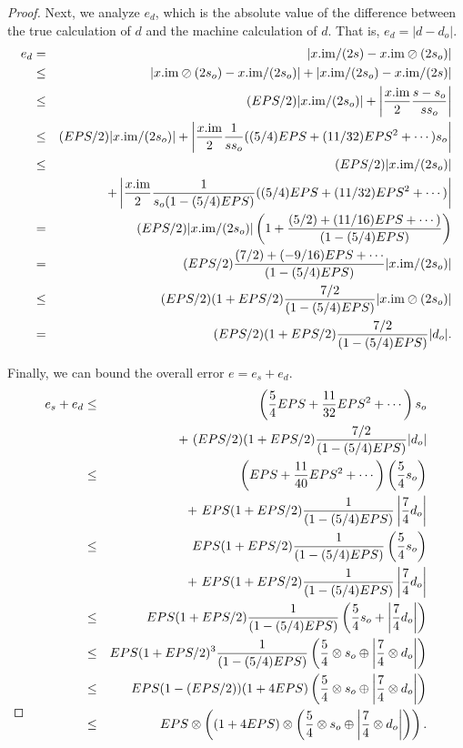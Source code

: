 \begin{proof}{}
Next, we analyze $e_d$, which is the absolute value of the difference between the true calculation of $d$ and the machine calculation of $d$.  That is, $e_d = |d - d_o|.$
\begin{eqnarray*}
e_d &=& |x.\mathrm {im}/(2s) - x.\mathrm {im} \oslash (2 s_o)|\\
&\le& |x.\mathrm {im} \oslash (2 s_o) - x.\mathrm {im} / (2 s_o)| + 
|x.\mathrm {im}/(2s_o) - x.\mathrm {im}/(2s) |\\
&\le& (EPS/2) |x.\mathrm {im} / (2 s_o)| + \left|{x.\mathrm {im} \over 2} {s - s_o \over s s_o} \right|\\
&\le& (EPS/2) |x .\mathrm {im}/ (2
s_o)| +\left|{x.\mathrm {im} \over 2} {1 \over s s_o} ((5/4)EPS + (11/32)EPS^2+\cdots) s_o\right|\\
&\le& (EPS/2) |x.\mathrm {im} / (2
s_o)| \\
&&+ \left|{x.\mathrm {im} \over 2} {1 \over s_o (1 - (5/4)EPS)}((5/4)EPS + (11/32)EPS^2+\cdots)\right|\\
&= &(EPS/2) |x .\mathrm {im}/ (2 s_o)| \left(1 + {(5/2) + (11/16)EPS+\cdots) \over (1 - (5/4)EPS)}\right)\\
&= &(EPS/2) {(7/2) + (-9/16) EPS +\cdots\over
(1 - (5/4)EPS)} |x .\mathrm {im}/ (2 s_o)|\\
&\le& (EPS/2) (1+EPS/2)
 {7/2 \over (1 - (5/4)EPS)}
|x .\mathrm {im} \oslash (2 s_o)|\\
&= &(EPS/2) (1+EPS/2)
 {7/2 \over (1 - (5/4)EPS)}
|d_o|.
\end{eqnarray*}
 
Finally, we can bound the overall error $e = e_s + e_d$.
\begin{eqnarray*}
e_s + e_d&\le& \left({5 \over 4} EPS + {11 \over 32} EPS^2 +\cdots\right) s_o\\
&& +\
 (EPS/2) (1+EPS/2)
 {7/2 \over (1 - (5/4)EPS)}|d_o|\\
&\le& \left( EPS + {11 \over 40} EPS^2 +\cdots\right) \left({5 \over 4} s_o\right) \\
&&+\
 EPS (1+EPS/2)
 {1 \over (1 - (5/4)EPS)}\left|{7 \over 4} d_o\right|\\
&\le& EPS (1+EPS/2)
 {1 \over (1 - (5/4)EPS)} \left({5 \over 4} s_o\right) \\
&&+
\  EPS (1+EPS/2)
 {1 \over (1 - (5/4)EPS)}\left|{7 \over 4} d_o\right|\\
&\le& EPS (1+EPS/2)
 {1 \over (1 - (5/4)EPS)}
\left({5 \over 4} s_o +\left|{7 \over 4} d_o\right|\right)\\
&\le& EPS (1+EPS/2)^3
 {1 \over (1 - (5/4)EPS)}
\left({5 \over 4} \otimes s_o \oplus \left|{7 \over 4} \otimes d_o\right|\right)\\
&\le& EPS (1 - (EPS/2))(1 + 4 EPS) 
\left({5 \over 4} \otimes s_o \oplus \left|{7 \over 4} \otimes d_o\right|\right)\\
&\le& EPS \otimes \left((1 + 4 EPS) \otimes
\left({5 \over 4} \otimes s_o \oplus \left|{7 \over 4} \otimes d_o\right|\right)\right).\\
\noalign{\vskip-36pt}
\end{eqnarray*}
\end{proof}
 
